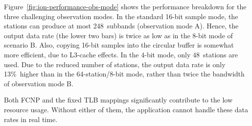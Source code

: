 \documentclass{sig-alternate}
\begin{document}
Figure~\ref{fig:ion-performance-obs-mode} shows the performance breakdown
for the three challenging observation modes.
In the standard 16-bit sample mode, the stations can produce at most
248~subbands (observation mode A).
Hence, the output data rate (the lower two bars) is twice as low as in the
8-bit mode of scenario B.
Also, copying 16-bit samples into the circular buffer is somewhat more
efficient, due to L3-cache effects.
In the 4-bit mode, only 48~stations are used.
Due to the reduced number of stations, the output data rate is only 13\%~higher
than in the 64-station/8-bit mode, rather than twice the bandwidth of
observation mode \textsf{B}.



Both FCNP and the fixed TLB mappings significantly contribute to the low
resource usage.
Without either of them, the application cannot handle these data rates in
real time.
\end{document}
